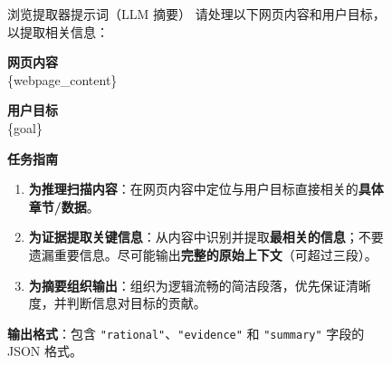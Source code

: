 \begin{figure}[!htbp]
\begin{paperbox}{浏览提取器提示词（LLM 摘要）}
请处理以下网页内容和用户目标，以提取相关信息：

\vspace{0.3cm}
\textbf{\large 网页内容} \\
\{webpage\_content\}

\vspace{0.3cm}
\textbf{\large 用户目标} \\
\{goal\}

\vspace{0.3cm}
\textbf{\large 任务指南}
\begin{enumerate}[leftmargin=*, label=\arabic*.]
\item \textbf{为推理扫描内容}：在网页内容中定位与用户目标直接相关的\textbf{具体章节/数据}。
\item \textbf{为证据提取关键信息}：从内容中识别并提取\textbf{最相关的信息}；不要遗漏重要信息。尽可能输出\textbf{完整的原始上下文}（可超过三段）。
\item \textbf{为摘要组织输出}：组织为逻辑流畅的简洁段落，优先保证清晰度，并判断信息对目标的贡献。
\end{enumerate}

\vspace{0.2cm}
\textbf{输出格式}：包含 \texttt{"rational"}、\texttt{"evidence"} 和 \texttt{"summary"} 字段的 JSON 格式。
\end{paperbox}
\end{figure}
